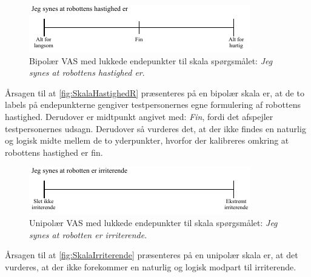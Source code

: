 %
\begin{figure}[H]
\centering
\includegraphics[width =\textwidth]{Figure/UdvalgteSkalaer/HastighedR} 
\caption{Bipolær VAS med lukkede endepunkter til skala spørgsmålet: \textit{Jeg synes at robottens hastighed er}.}
\label{fig:SkalaHastighedR}
\end{figure}
\noindent
%
Årsagen til at \autoref{fig:SkalaHastighedR} præsenteres på en bipolær skala er, at de to labels på endepunkterne gengiver testpersonernes egne formulering af robottens hastighed. Derudover er midtpunkt angivet med: \textit{Fin}, fordi det afspejler testpersonernes udsagn. Derudover så vurderes det, at der ikke findes en naturlig og logisk midte mellem de to yderpunkter, hvorfor der kalibreres omkring at robottens hastighed er fin. 
%
\begin{figure}[H]
\centering
\includegraphics[width =\textwidth]{Figure/UdvalgteSkalaer/Irriterende} 
\caption{Unipolær VAS med lukkede endepunkter til skala spørgsmålet: \textit{Jeg synes at robotten er irriterende}.}
\label{fig:SkalaIrriterende}
\end{figure}
\noindent
%
Årsagen til at \autoref{fig:SkalaIrriterende} præsenteres på en unipolær skala er, at det vurderes, at der ikke forekommer en naturlig og logisk modpart til irriterende.

